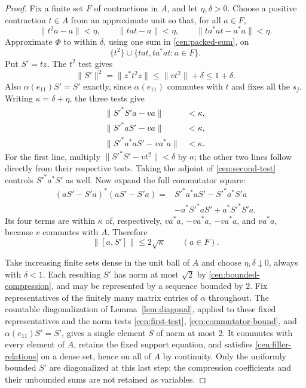 \begin{proof}
Fix a finite set $F$ of contractions in $A$, and let $\eta,\delta>0$.
Choose a positive contraction $t\in A$ from an approximate unit so
that, for all $a\in F$,
\[
 \|t^2a-a\|<\eta,\qquad
 \|tat-a\|<\eta,\qquad
 \|ta^*at-a^*a\|<\eta.
\]
Approximate $\Phi$ to within $\delta$, using one sum in
\eqref{cen:packed-sum}, on
\[
 \{t^2\}\cup\{tat,ta^*at:a\in F\}.
\]
Put $S'=tz$.  The $t^2$ test gives
\begin{equation}\label{cen:bounded-compression}
 \|S'\|^2=\|z^*t^2z\|\le\|vt^2\|+\delta\le1+\delta.
\end{equation}
Also $\alpha(e_{11})S'=S'$ exactly, since $\alpha(e_{11})$
commutes with $t$ and fixes all the $s_j$.  Writing
$\kappa=\delta+\eta$, the three tests give
\begin{align}
 \|S'^*S'a-va\|&<\kappa,\label{cen:first-test}\\
 \|S'^*aS'-va\|&<\kappa,\label{cen:second-test}\\
 \|S'^*a^*aS'-va^*a\|&<\kappa.\label{cen:third-test}
\end{align}
For the first line, multiply
$\|S'^*S'-vt^2\|<\delta$ by $a$; the other two lines follow
directly from their respective tests.  Taking the adjoint of
\eqref{cen:second-test} controls $S'^*a^*S'$ as well.
Now expand the full commutator square:
\begin{align*}
 (aS'-S'a)^*(aS'-S'a)
   ={}&S'^*a^*aS'-S'^*a^*S'a\\
     &-a^*S'^*aS'+a^*S'^*S'a.
\end{align*}
Its four terms are within $\kappa$ of, respectively,
$va^*a$, $-va^*a$, $-va^*a$, and $va^*a$, because $v$ commutes
with $A$.  Therefore
\begin{equation}\label{cen:commutator-bound}
 \|[a,S']\|\le2\sqrt\kappa\qquad(a\in F).
\end{equation}

Take increasing finite sets dense in the unit ball of $A$ and choose
$\eta,\delta\downarrow0$, always with $\delta<1$.  Each resulting
$S'$ has norm at most $\sqrt2$ by
\eqref{cen:bounded-compression}, and may be represented by a sequence
bounded by $2$.  Fix representatives of the finitely many matrix
entries of $\alpha$ throughout.  The countable diagonalization of
Lemma~\ref{lem:diagonal}, applied to these fixed representatives and
the norm tests \eqref{cen:first-test},
\eqref{cen:commutator-bound}, and
$\alpha(e_{11})S'=S'$, gives a single element $S$ of norm at most $2$.
It commutes with every element of $A$, retains the fixed support
equation, and satisfies \eqref{cen:filler-relations} on a dense set,
hence on all of $A$ by continuity.  Only the uniformly bounded $S'$
are diagonalized at this last step; the compression coefficients and
their unbounded sums are not retained as variables.
\end{proof}
